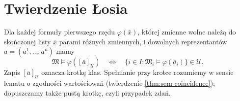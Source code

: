 \section{Twierdzenie Łosia}
\label{sec:mod-los}
\begin{twierdzenie}
\label{thm:mod-los}
Dla każdej formuły pierwszego rzędu $\varphi(\bar x)$,
której zmienne wolne należą do skończonej listy $\bar x$
parami różnych zmiennych,
i dowolnych reprezentantów $\bar a=(a^1,\ldots,a^n)$ mamy
\[
\mathfrak M\models\varphi([\bar a]_{\mathcal U})
\quad\Longleftrightarrow\quad
\{i\in I:\mathfrak M_i\models\varphi(\bar a_i)\}\in\mathcal U.
\]
Zapis $[\bar a]_{\mathcal U}$ oznacza krotkę klas. Spełnianie
przy krotce rozumiemy w sensie lematu o zgodności wartościowań
(twierdzenie \ref{thm:sem-coincidence}); dopuszczamy także
pustą krotkę, czyli przypadek zdań.
\end{twierdzenie}
